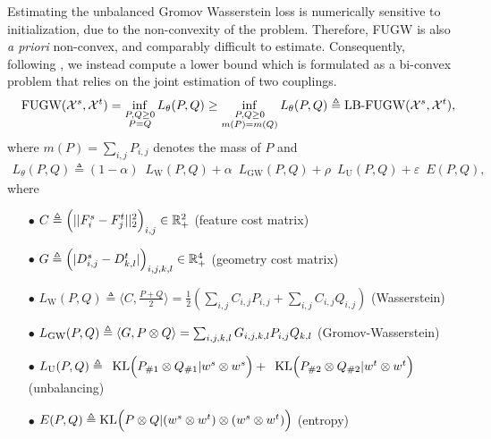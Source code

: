 Estimating the unbalanced Gromov Wasserstein loss is numerically sensitive to initialization,
due to the non-convexity of the problem.
Therefore, FUGW is also \textit{a priori} non-convex, and comparably difficult to estimate.
Consequently, following \citep{Sejourne20}, we instead compute a lower bound which
is formulated as a bi-convex problem that relies on the joint estimation of two couplings.
\begin{align}
    \label{eq:lbfugw}
    \quad \text{FUGW}(\mathcal X^s, \mathcal X^t) = \inf_{\substack{P, Q \geq 0 \\ P = Q}} L_{\theta}(P, Q)
    \geq \inf_{\substack{P, Q \geq 0 \\ m(P) = m(Q)}}
    L_{\theta}(P, Q) \triangleq \text{LB-FUGW} (\mathcal X^s, \mathcal X^t),
\end{align}
where $m(P) = \sum_{i,j} P_{i,j}$ denotes the mass of $P$ and
\begin{equation}
    \label{eq:fugw_loss_two_couplings}
    \begin{split}
        L_{\theta}(P, Q) \triangleq
        (1 - \alpha) \enspace L_{\text{W}}(P, Q) + \alpha \enspace L_{\text{GW}}(P, Q)
        + \rho \enspace L_{\text{U}}(P, Q) + \varepsilon \enspace E(P, Q),
    \end{split}
\end{equation}
where
\begin{itemize}
    \item[$\bullet$] $C \triangleq \Big( ||F^s_{i} - F^t_j||^2_2\Big)_{i,j} \in \mathbb R^2_+$ \hfill (feature cost matrix)

    \item[$\bullet$] $G \triangleq \Big( |D^s_{i,j} - D^t_{k,l}| \Big)_{i,j,k,l} \in \mathbb R^4_+$ \hfill (geometry cost matrix)

    \item[$\bullet$] $L_{\text{W}}(P, Q) \triangleq \langle C, \frac{P + Q}{2} \rangle = \frac{1}{2} ( \sum_{i,j} C_{i,j}P_{i,j} + \sum_{i,j} C_{i,j}Q_{i,j})$ \hfill (Wasserstein)

    \item[$\bullet$] $L_{\text{GW}}(P, Q) \triangleq \langle G , P \otimes Q \rangle = \sum_{i,j,k,l}G_{i,j,k,l}P_{i,j}Q_{k,l}$ \hfill (Gromov-Wasserstein)

    \item[$\bullet$] $L_{\text{U}}(P, Q) \triangleq \enspace \text{KL} \Big(P_{\# 1} \otimes Q_{\# 1} \vert w^s \otimes w^s \Big) + \enspace \text{KL} \Big(P_{\# 2} \otimes Q_{\# 2} \vert w^t \otimes w^t \Big)$ \hfill (unbalancing)

    \item[$\bullet$] $E(P, Q) \triangleq \text{KL} \Big(P \otimes Q | (w^s \otimes w^t) \otimes (w^s \otimes w^t) \Big)$ \hfill (entropy)
\end{itemize}
